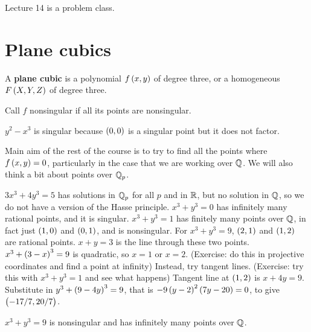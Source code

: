 
Lecture 14 is a problem class.

\pagebreak

\section{Plane cubics}


\begin{definition}
A \textbf{plane cubic} is a polynomial $ f\br{x, y} $ of degree three, or a homogeneous $ F\br{X, Y, Z} $ of degree three.
\end{definition}

Call $ f $ nonsingular if all its points are nonsingular.

\begin{example*}
$ y^2 - x^3 $ is singular because $ \br{0, 0} $ is a singular point but it does not factor.
\end{example*}

Main aim of the rest of the course is to try to find all the points where $ f\br{x, y} = 0 $, particularly in the case that we are working over $ \mathbb{Q} $. We will also think a bit about points over $ \mathbb{Q}_p $.

\begin{example*}
$ 3x^3 + 4y^3 = 5 $ has solutions in $ \mathbb{Q}_p $ for all $ p $ and in $ \mathbb{R} $, but no solution in $ \mathbb{Q} $, so we do not have a version of the Hasse principle. $ x^3 + y^3 = 0 $ has infinitely many rational points, and it is singular. $ x^3 + y^3 = 1 $ has finitely many points over $ \mathbb{Q} $, in fact just $ \br{1, 0} $ and $ \br{0, 1} $, and is nonsingular. For $ x^3 + y^3 = 9 $, $ \br{2, 1} $ and $ \br{1, 2} $ are rational points. $ x + y = 3 $ is the line through these two points. $ x^3 + \br{3 - x}^3 = 9 $ is quadratic, so $ x = 1 $ or $ x = 2 $. (Exercise: do this in projective coordinates and find a point at infinity) Instead, try tangent lines. (Exercise: try this with $ x^3 + y^3 = 1 $ and see what happens) Tangent line at $ \br{1, 2} $ is $ x + 4y = 9 $. Substitute in $ y^3 + \br{9 - 4y}^3 = 9 $, that is $ -9\br{y - 2}^2\br{7y - 20} = 0 $, to give $ \br{-17 / 7, 20 / 7} $.
\end{example*}

\begin{lemma}
$ x^3 + y^3 = 9 $ is nonsingular and has infinitely many points over $ \mathbb{Q} $.
\end{lemma}

